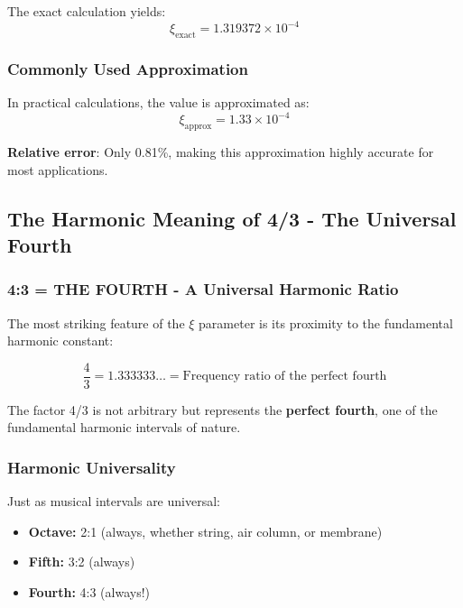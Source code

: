 	The exact calculation yields:
	\begin{equation}
		\xi_{\text{exact}} = 1.319372 \times 10^{-4}
		\label{eq:xi_exact}
	\end{equation}
	
	\subsubsection{Commonly Used Approximation}
	\label{subsubsec:approximation}
	
	In practical calculations, the value is approximated as:
	\begin{equation}
		\xi_{\text{approx}} = 1.33 \times 10^{-4}
		\label{eq:xi_approx}
	\end{equation}
	
	\textbf{Relative error}: Only 0.81\%, making this approximation highly accurate for most applications.
	
	\subsection{The Harmonic Meaning of 4/3 - The Universal Fourth}
	\label{subsec:four_thirds_proximity}
	
	\subsubsection{4:3 = THE FOURTH - A Universal Harmonic Ratio}
	\label{subsubsec:four_thirds_connection}
	
	The most striking feature of the $\xi$ parameter is its proximity to the fundamental harmonic constant:
	
	\begin{equation}
		\frac{4}{3} = 1.333333\ldots = \text{Frequency ratio of the perfect fourth}
		\label{eq:four_thirds}
	\end{equation}
	
	The factor 4/3 is not arbitrary but represents the \textbf{perfect fourth}, one of the fundamental harmonic intervals of nature.
	
	\subsubsection{Harmonic Universality}
	\label{subsubsec:harmonic_universality}
	
	Just as musical intervals are universal:
	\begin{itemize}
		\item \textbf{Octave:} 2:1 (always, whether string, air column, or membrane)
		\item \textbf{Fifth:} 3:2 (always)
		\item \textbf{Fourth:} 4:3 (always!)
	\end{itemize}
	
